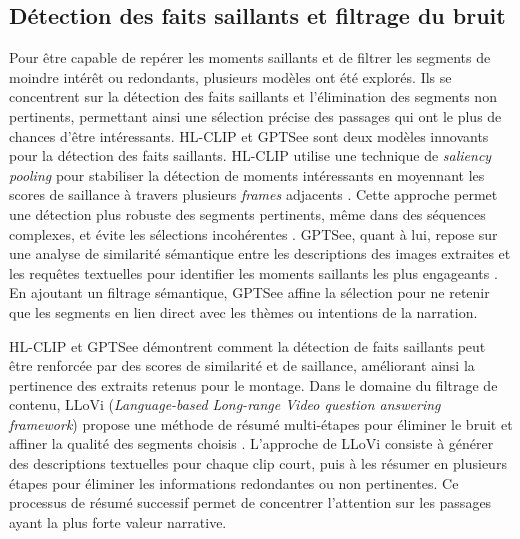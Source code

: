 \subsection{Détection des faits saillants et filtrage du bruit}
Pour être capable de repérer les moments saillants et de filtrer les segments de moindre intérêt ou redondants, plusieurs modèles ont été explorés. Ils se concentrent sur la détection des faits saillants et l’élimination des segments non pertinents, permettant ainsi une sélection précise des passages qui ont le plus de chances d’être intéressants. HL-CLIP et GPTSee sont deux modèles innovants pour la détection des faits saillants. HL-CLIP utilise une technique de \textit{saliency pooling} pour stabiliser la détection de moments intéressants en moyennant les scores de saillance à travers plusieurs \textit{frames} adjacents \cite{han2024_clip}\cite{sun2023_gptsee}. Cette approche permet une détection plus robuste des segments pertinents, même dans des séquences complexes, et évite les sélections incohérentes \cite{you2023_ferret}\cite{sun2023_gptsee}. GPTSee, quant à lui, repose sur une analyse de similarité sémantique entre les descriptions des images extraites et les requêtes textuelles pour identifier les moments saillants les plus engageants \cite{sun2023_gptsee}\cite{liu2022_umt}. En ajoutant un filtrage sémantique, GPTSee affine la sélection pour ne retenir que les segments en lien direct avec les thèmes ou intentions de la narration. 

HL-CLIP et GPTSee démontrent comment la détection de faits saillants peut être renforcée par des scores de similarité et de saillance, améliorant ainsi la pertinence des extraits retenus pour le montage. Dans le domaine du filtrage de contenu, LLoVi (\textit{Language-based Long-range Video question answering framework}) propose une méthode de résumé multi-étapes pour éliminer le bruit et affiner la qualité des segments choisis \cite{anonymous2023_valley}\cite{zhang2019_memory}. L’approche de LLoVi consiste à générer des descriptions textuelles pour chaque clip court, puis à les résumer en plusieurs étapes pour éliminer les informations redondantes ou non pertinentes. Ce processus de résumé successif permet de concentrer l’attention sur les passages ayant la plus forte valeur narrative. 

